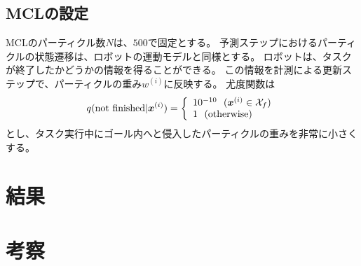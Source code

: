 \subsection{MCLの設定}
MCLのパーティクル数$N$は、$500$で固定とする。
予測ステップにおけるパーティクルの状態遷移は、ロボットの運動モデルと同様とする。
ロボットは、タスクが終了したかどうかの情報を得ることができる。
この情報を計測による更新ステップで、パーティクルの重み$w^{(i)}$に反映する。
尤度関数は
\begin{equation}
  q({\rm not \  finished} | \bm{x}^{(i)}) =
  \left\{
    \begin{array}{l}
      10^{-10} \ \ (\bm{x}^{(i)} \in \mathcal{X}_{f}) \\
      1 \ \ ({\rm otherwise})
    \end{array}
  \right.
\end{equation}
とし、タスク実行中にゴール内へと侵入したパーティクルの重みを非常に小さくする。

\section{結果} \label{section:結果}


\section{考察} \label{section:考察}
